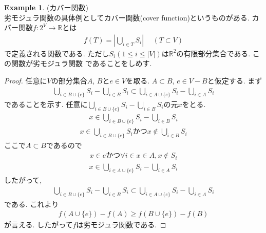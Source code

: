 \documentclass[11pt, a4paper, dvipdfmx]{jsbook}
\theoremstyle{definition}
\newtheorem{Example+}[Axiom+]{Example}
\newcommand{\R}{\mathbb{R}}
\newcommand{\dip}{\displaystyle}
\begin{document}
\begin{Example+}(カバー関数)\\
    劣モジュラ関数の具体例としてカバー関数(cover function)というものがある. カバー関数$f: 2^{V}\to\R$とは
    \begin{align*}
        f(T) = \left|\bigcup_{i\in T}S_{i}\right|\hspace{15pt}(T\subset V)
    \end{align*}
    で定義される関数である. ただし$S_{i}(1 \leq i\leq |V|)$は$\R^{2}$の有限部分集合である. この関数が劣モジュラ関数
    であることをしめす.
    \begin{proof}
        任意に$V$の部分集合$A$, $B$と$e\in V$を取る. $A\subset B$, $e\in V - B$と仮定する.
        まず
        \begin{align*}
            \bigcup_{i\in B\cup\{e\}}S_{i} - \bigcup_{i\in B}S_{i}\subset\bigcup_{i\in A\cup\{e\}}S_{i} - \bigcup_{i\in A}S_{i}
        \end{align*}
        であることを示す. 任意に$\dip \bigcup_{i\in B\cup\{e\}}S_{i} - \bigcup_{i\in B}S_{i}$の元$x$をとる.
        \begin{align*}
            x\in\bigcup_{i\in B\cup\{e\}}S_{i} - \bigcup_{i\in B}S_{i}
        \end{align*}
        \begin{align*}
            x\in\bigcup_{i\in B\cup\{e\}}S_{i} かつ x\notin\bigcup_{i\in B}S_{i}
        \end{align*}
        ここで$A\subset B$であるので
        \begin{align*}
            x\in eかつ\forall i\in x\in A, x\notin S_{i} 
        \end{align*}
        \begin{align*}
            x\in\bigcup_{i\in A\cup\{e\}}S_{i} - \bigcup_{i\in A}S_{i}
        \end{align*}
        したがって, 
        \begin{align*}
            \bigcup_{i\in B\cup\{e\}}S_{i} - \bigcup_{i\in B}S_{i}\subset\bigcup_{i\in A\cup\{e\}}S_{i} - \bigcup_{i\in A}S_{i}
        \end{align*}
        である. これより
        \begin{align*}
            f(A\cup\{e\}) - f(A) \geq f(B\cup\{e\}) - f(B)
        \end{align*}
        が言える. したがって$f$は劣モジュラ関数である.
    \end{proof}
\end{Example+}
\end{document}
